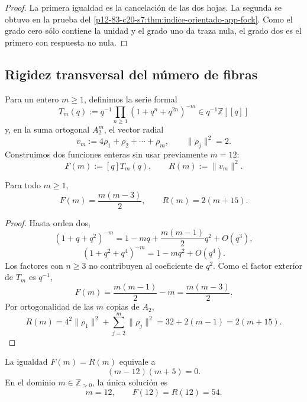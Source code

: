 \begin{proof}
La primera igualdad es la cancelación de las dos hojas. La segunda se
obtuvo en la prueba del \cref{p12-83-c20-s7:thm:indice-orientado-app-fock}. Como el grado
cero sólo contiene la unidad y el grado uno da traza nula, el grado dos es
el primero con respuesta no nula.
\end{proof}

\subsection{Rigidez transversal del número de fibras}

Para un entero \(m\ge1\), definimos la serie formal
\begin{equation}
 T_m(q):=
 q^{-1}\prod_{n\ge1}(1+q^n+q^{2n})^{-m}
 \in q^{-1}\mathbb Z[[q]]
 \label{p12-83-c20-s7:eq:familia-fock-m-fibras-u030}
\end{equation}
y, en la suma ortogonal \(A_2^m\), el vector radial
\begin{equation}
 v_m:=4\rho_1+\rho_2+\cdots+\rho_m,
 \qquad
 \|\rho_j\|^2=2.
 \label{p12-83-c20-s7:eq:familia-radial-m-fibras-u030}
\end{equation}
Construimos dos funciones enteras sin usar previamente \(m=12\):
\[
 F(m):=[q]T_m(q),
 \qquad
 R(m):=\|v_m\|^2.
\]

\begin{proposition}
\label{p12-83-c20-s7:prop:dos-funciones-rigidez-doce-u030}
Para todo \(m\ge1\),
\begin{equation}
 F(m)=\frac{m(m-3)}2,
 \qquad
 R(m)=2(m+15).
 \label{p12-83-c20-s7:eq:funciones-rigidez-doce-u030}
\end{equation}
\end{proposition}

\begin{proof}
Hasta orden dos,
\[
 (1+q+q^2)^{-m}
 =1-mq+\frac{m(m-1)}2q^2+O(q^3),
\]
\[
 (1+q^2+q^4)^{-m}=1-mq^2+O(q^4).
\]
Los factores con \(n\ge3\) no contribuyen al coeficiente de \(q^2\).
Como el factor exterior de \(T_m\) es \(q^{-1}\),
\[
 F(m)=\frac{m(m-1)}2-m=\frac{m(m-3)}2.
\]
Por ortogonalidad de las \(m\) copias de \(A_2\),
\[
 R(m)=4^2\|\rho_1\|^2+
 \sum_{j=2}^{m}\|\rho_j\|^2
 =32+2(m-1)=2(m+15).
\]
\end{proof}

\begin{theorem}
\label{p12-83-c20-s7:thm:rigidez-transversal-doce-u030}
La igualdad \(F(m)=R(m)\) equivale a
\begin{equation}
 (m-12)(m+5)=0.
 \label{p12-83-c20-s7:eq:ecuacion-rigidez-doce-u030}
\end{equation}
En el dominio \(m\in\mathbb Z_{>0}\), la única solución es
\[
 \boxed{m=12,\qquad F(12)=R(12)=54.}
\]
\end{theorem}

